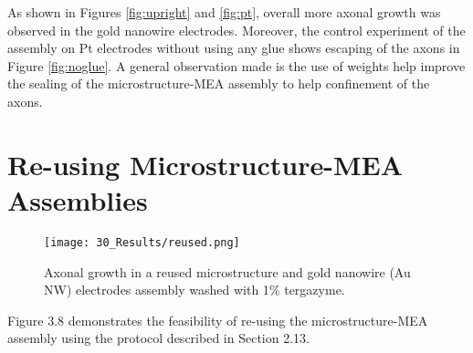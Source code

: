 As shown in Figures \ref{fig:upright} and \ref{fig:pt}, overall more axonal growth was observed in the gold nanowire electrodes. Moreover, the control experiment of the assembly on Pt electrodes without using any glue shows escaping of the axons in Figure \ref{fig:noglue}. A general observation made is the use of weights help improve the sealing of the microstructure-MEA assembly to help confinement of the axons.

\section{Re-using Microstructure-MEA Assemblies}

\begin{figure}[H]
\centering
\texttt{[image: 30\_Results/reused.png]}
\caption{Axonal growth in a reused microstructure and gold nanowire (Au NW) electrodes assembly washed with 1$\%$ tergazyme.}
\label{fig:CoatingResults2}
\end{figure}

Figure 3.8 demonstrates the feasibility of re-using the microstructure-MEA assembly using the protocol described in Section 2.13.